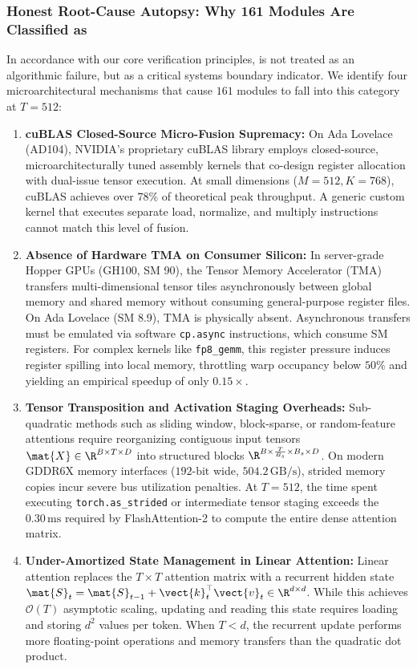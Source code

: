 \subsubsection{Honest Root-Cause Autopsy: Why 161 Modules Are Classified as \passslow{}}
\label{sec:results_slow_autopsy}

In accordance with our core verification principles, \passslow{} is not treated as an algorithmic failure, but as a critical systems boundary indicator. We identify four microarchitectural mechanisms that cause $161$ modules to fall into this category at $T=512$:
\begin{enumerate}
    \item \textbf{cuBLAS Closed-Source Micro-Fusion Supremacy:} On Ada Lovelace (AD104), NVIDIA's proprietary cuBLAS library employs closed-source, microarchitecturally tuned assembly kernels that co-design register allocation with dual-issue tensor execution. At small dimensions ($M=512, K=768$), cuBLAS achieves over $78\%$ of theoretical peak throughput. A generic custom kernel that executes separate load, normalize, and multiply instructions cannot match this level of fusion.
    \item \textbf{Absence of Hardware TMA on Consumer Silicon:} In server-grade Hopper GPUs (GH100, SM 90), the Tensor Memory Accelerator (TMA) transfers multi-dimensional tensor tiles asynchronously between global memory and shared memory without consuming general-purpose register files. On Ada Lovelace (SM 8.9), TMA is physically absent. Asynchronous transfers must be emulated via software \lstinline{cp.async} instructions, which consume SM registers. For complex kernels like \texttt{fp8\_gemm}, this register pressure induces register spilling into local memory, throttling warp occupancy below $50\%$ and yielding an empirical speedup of only $0.15\times$.
    \item \textbf{Tensor Transposition and Activation Staging Overheads:} Sub-quadratic methods such as sliding window, block-sparse, or random-feature attentions require reorganizing contiguous input tensors $\mat{X} \in \R^{B \times T \times D}$ into structured blocks $\R^{B \times \frac{T}{B_s} \times B_s \times D}$. On modern GDDR6X memory interfaces ($192\text{-bit}$ wide, $504.2\,\text{GB/s}$), strided memory copies incur severe bus utilization penalties. At $T=512$, the time spent executing \lstinline{torch.as_strided} or intermediate tensor staging exceeds the $0.30\,\text{ms}$ required by FlashAttention-2 to compute the entire dense attention matrix.
    \item \textbf{Under-Amortized State Management in Linear Attention:} Linear attention replaces the $T \times T$ attention matrix with a recurrent hidden state $\mat{S}_t = \mat{S}_{t-1} + \vect{k}_t^\top \vect{v}_t \in \R^{d \times d}$. While this achieves $\mathcal{O}(T)$ asymptotic scaling, updating and reading this state requires loading and storing $d^2$ values per token. When $T < d$, the recurrent update performs more floating-point operations and memory transfers than the quadratic dot product.
\end{enumerate}

